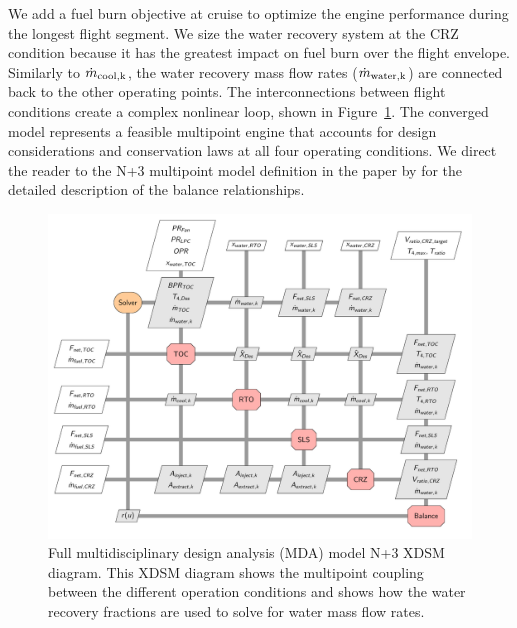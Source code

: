 \documentclass[conf]{new-aiaa}
\begin{document}
We add a fuel burn objective at cruise to optimize the engine performance during the longest flight segment.
We size the water recovery system at the CRZ condition because it has the greatest impact on fuel burn over the flight envelope.
Similarly to $\dot{m}_{\rm{cool},k}$, the water recovery mass flow rates ($\dot{m}_{\rm{water},k}$) are connected back to the other operating points.
The interconnections between flight conditions create a complex nonlinear loop, shown in Figure~\ref{fig:N3_xdsm_full}.
The converged model represents a feasible multipoint engine that accounts for design considerations and conservation laws at all four operating conditions.
We direct the reader to the N+3 multipoint model definition in the paper by \citet{Hendricks2019} for the detailed description of the balance relationships.

\begin{figure}[hbt!]
  \centering
  \includegraphics[width=\textwidth]{N3_xdsm_full.pdf}
  \caption{
    Full multidisciplinary design analysis (MDA) model N+3 XDSM diagram.
    This XDSM diagram shows the multipoint coupling between the different operation conditions and shows how the water recovery fractions are used to solve for water mass flow rates.
  }
  \label{fig:N3_xdsm_full}
\end{figure}
\end{document}
